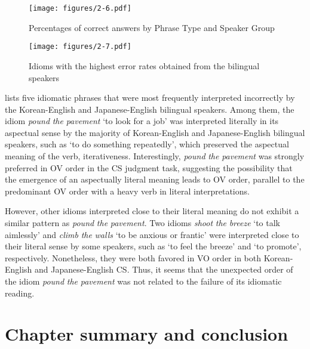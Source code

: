 \begin{figure} 
    \centering
    \texttt{[image: figures/2-6.pdf]}
    \caption{Percentages of correct answers by Phrase Type and Speaker Group}
    \label{fig:2.6}
\end{figure}

\begin{figure}
    \centering
    \texttt{[image: figures/2-7.pdf]}
    \caption{Idioms with the highest error rates obtained from the bilingual speakers}
    \label{fig:2.7}
\end{figure}

\newpage
  lists five idiomatic phrases that were most frequently interpreted incorrectly by the Korean-English and Japanese-English bilingual speakers. Among them, the idiom \textit{pound} \textit{the} \textit{pavement} ‘to look for a job’ was interpreted literally in its aspectual sense by the majority of Korean-English and Japanese-English bilingual speakers, such as ‘to do something repeatedly’, which preserved the aspectual meaning of the verb, iterativeness. Interestingly, \textit{pound} \textit{the} \textit{pavement} was strongly preferred in \ac{OV} order in the \ac{CS} judgment task, suggesting the possibility that the emergence of an aspectually literal meaning leads to \ac{OV} order, parallel to the predominant \ac{OV} order with a heavy verb in literal interpretations.

  However, other idioms interpreted close to their literal meaning do not exhibit a similar pattern as \textit{pound} \textit{the} \textit{pavement}. Two idioms \textit{shoot} \textit{the} \textit{breeze} ‘to talk aimlessly’ and \textit{climb} \textit{the} \textit{walls} ‘to be anxious or frantic’ were interpreted close to their literal sense by some speakers, such as ‘to feel the breeze’ and ‘to promote’, respectively. Nonetheless, they were both favored in \ac{VO} order in both Korean-English and Japanese-English \ac{CS}. Thus, it seems that the unexpected order of the idiom \textit{pound} \textit{the} \textit{pavement} was not related to the failure of its idiomatic reading. 

\section{Chapter summary and conclusion}\label{ch2:sect:2.4}  

